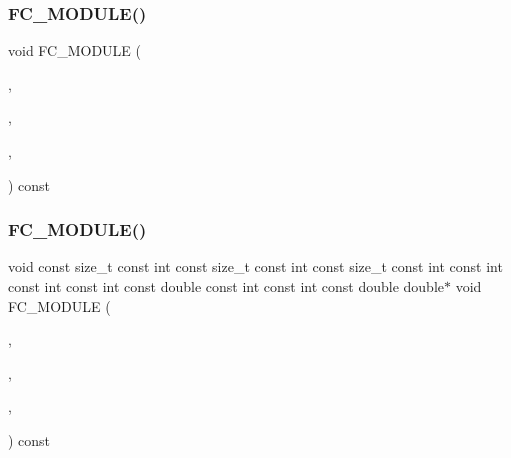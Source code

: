 \subsubsection{\texorpdfstring{F\+C\+\_\+\+M\+O\+D\+U\+L\+E()}{FC\_MODULE()}\hspace{0.1cm}{\footnotesize\ttfamily [2/4]}}
{\footnotesize\ttfamily void F\+C\+\_\+\+M\+O\+D\+U\+LE (\begin{DoxyParamCaption}\item[{operators}]{,  }\item[{applyoperatorv}]{,  }\item[{O\+P\+E\+R\+A\+T\+O\+RS}]{,  }\item[{A\+P\+P\+L\+Y\+O\+P\+E\+R\+A\+T\+O\+RV}]{ }\end{DoxyParamCaption}) const}

\hypertarget{OperatorKernels_8H_a67543feeb7d805fb38829e67abe1ae91}{}\label{OperatorKernels_8H_a67543feeb7d805fb38829e67abe1ae91} 
\subsubsection{\texorpdfstring{F\+C\+\_\+\+M\+O\+D\+U\+L\+E()}{FC\_MODULE()}\hspace{0.1cm}{\footnotesize\ttfamily [3/4]}}
{\footnotesize\ttfamily void const size\+\_\+t const int const size\+\_\+t const int const size\+\_\+t const int const int const int const int const double const int const int const double double$\ast$ void F\+C\+\_\+\+M\+O\+D\+U\+LE (\begin{DoxyParamCaption}\item[{operators}]{,  }\item[{applyoperatorblobs}]{,  }\item[{O\+P\+E\+R\+A\+T\+O\+RS}]{,  }\item[{A\+P\+P\+L\+Y\+O\+P\+E\+R\+A\+T\+O\+R\+B\+L\+O\+BS}]{ }\end{DoxyParamCaption}) const}

\hypertarget{OperatorKernels_8H_ab9e653623e29ac7992a41a4fa2b0847b}{}\label{OperatorKernels_8H_ab9e653623e29ac7992a41a4fa2b0847b} 
